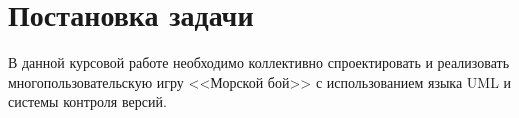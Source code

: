 \section{Постановка задачи}
 В данной курсовой работе необходимо коллективно спроектировать и реализовать
 многопользовательскую игру <<Морской бой>> с использованием языка UML и системы контроля версий.
\endinput

